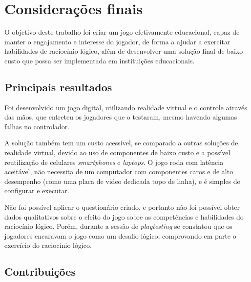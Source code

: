 
\chapter{Considerações finais}\label{cap-consideracoes-finais}

O objetivo deste trabalho foi criar um jogo efetivamente educacional, capaz de manter o engajamento e interesse do jogador, de forma a ajudar a exercitar habilidades de raciocínio lógico, além de desenvolver uma solução final de baixo custo que possa ser implementada em instituições educacionais.

\section{Principais resultados}\label{sec-conc-resultados}

Foi desenvolvido um jogo digital, utilizando realidade virtual 
e o controle através das mãos, que entreteu os jogadores que o 
testaram, mesmo havendo algumas falhas no controlador. 

A solução também tem um custo acessível, se comparado a outras soluções 
de realidade virtual, devido ao uso de componentes de baixo custo e a 
possível reutilização de celulares \textit{smartphones} e \textit{laptops}. 
O jogo roda com latência aceitável, não necessita de um computador com 
componentes caros e de alto desempenho (como uma placa de video dedicada 
topo de linha), e é simples de configurar e executar.

Não foi possível aplicar o questionário criado, e portanto não foi 
possível obter dados qualitativos sobre o efeito do jogo sobre as 
competências e habilidades do raciocínio lógico. Porém, durante a 
sessão de \textit{playtesting} se constatou que os jogadores 
encaravam o jogo como um desafio lógico, comprovando em parte o 
exercício do raciocínio lógico.

\section{Contribuições}\label{sec-conc-contribuicoes}

